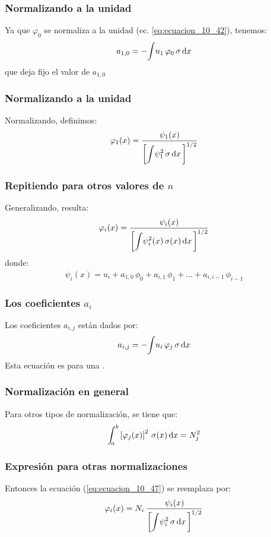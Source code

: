 \documentclass[12pt]{beamer}
\begin{document}
\begin{frame}
\frametitle{Normalizando a la unidad}
Ya que $\varphi_{0}$ se normaliza a la unidad (ec. \ref{eq:ecuacion_10_42}), tenemos:
\pause
\begin{align}
a_{1,0} = - \scaleint{5ex} u_{1} \, \varphi_{0} \, \sigma \dd{x}
\label{eq:ecuacion_10_45}
\end{align}
que deja fijo el valor de $a_{1, 0}$
\end{frame}
\begin{frame}
\frametitle{Normalizando a la unidad}
Normalizando, definimos:
\pause
\begin{align}
\varphi_{1} (x) = \dfrac{\psi_{1} (x)}{ \bigg[ \displaystyle \scaleint{5ex} \psi_{1}^{2} \, \sigma \dd{x} \bigg]^{1/2}}
\label{eq:ecuacion_10_46}
\end{align}
\end{frame}
\begin{frame}
\frametitle{Repitiendo para otros valores de $n$}
Generalizando, resulta:
\pause
\begin{align}
\varphi_{i} (x) = \dfrac{\psi_{i} (x)}{ \bigg[ \displaystyle \scaleint{5ex} \psi_{i}^{2} (x) \, \sigma (x) \dd{x} \bigg]^{1/2}}
\label{eq:ecuacion_10_47}
\end{align}
\pause
donde:
\pause
\begin{align}
\psi_{i}(x) = u_{i} + a_{1, 0} \, \phi_{0} + a_{i, 1} \, \phi_{1} + \ldots + a_{i, i-1} \, \phi_{i-1}
\label{eq:ecuacion_10_48}
\end{align}
\end{frame}
\begin{frame}
\frametitle{Los coeficientes $a_{i}$}
Los coeficientes $a_{i, j}$ están dados por:
\pause
\begin{align}
a_{i, j} = - \scaleint{5ex} u_{i} \, \varphi_{j} \, \sigma  \dd{x}
\label{eq:ecuacion_10_49}
\end{align}
Esta ecuación es para una .
\end{frame}
\begin{frame}
\frametitle{Normalización en general}
Para otros tipos de normalización, se tiene que:
\pause
\begin{align*}
\scaleint{5ex}_{\bs a}^{b} \left[ \varphi_{j} (x) \right]^{2} \, \sigma (x) \dd{x} =  N_{j}^{2}
\end{align*}
\end{frame}
\begin{frame}
\frametitle{Expresión para otras normalizaciones}
Entonces la ecuación (\ref{eq:ecuacion_10_47}) se reemplaza por:
\pause
\begin{align}
\varphi_{i} (x) =  N_{i} \: \dfrac{\psi_{i} (x)}{ \bigg[ \displaystyle \scaleint{5ex} \psi_{i}^{2} \, \sigma \dd{x} \bigg]^{1/2}}
\label{eq:ecuacion_10_47a}
\end{align}
\end{frame}
\end{document}
